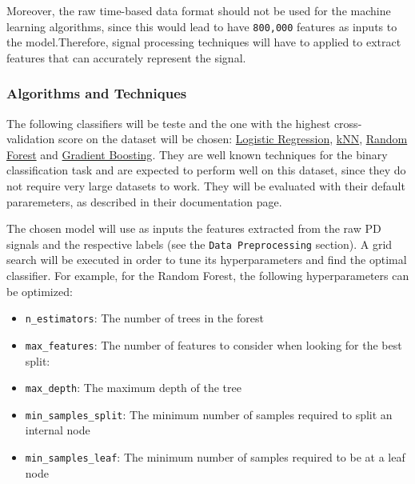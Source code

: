 \documentclass[11pt]{article}
\providecommand{\tightlist}{%
      \setlength{\itemsep}{0pt}\setlength{\parskip}{0pt}}
\begin{document}
Moreover, the raw time-based data format should not be used for the
machine learning algorithms, since this would lead to have
\texttt{800,000} features as inputs to the model.Therefore, signal
processing techniques will have to applied to extract features that can
accurately represent the signal.

\hypertarget{algorithms-and-techniques}{%
\subsubsection{Algorithms and
Techniques}\label{algorithms-and-techniques}}

The following classifiers will be teste and the one with the highest
cross-validation score on the dataset will be chosen:
\href{https://scikit-learn.org/stable/modules/generated/sklearn.linear_model.LogisticRegression.html}{Logistic
Regression},
\href{https://scikit-learn.org/stable/modules/generated/sklearn.neighbors.KNeighborsClassifier.html}{kNN},
\href{https://scikit-learn.org/stable/modules/generated/sklearn.ensemble.RandomForestClassifier.html}{Random
Forest} and
\href{https://scikit-learn.org/stable/modules/generated/sklearn.ensemble.GradientBoostingClassifier.html}{Gradient
Boosting}. They are well known techniques for the binary classification
task and are expected to perform well on this dataset, since they do not
require very large datasets to work. They will be evaluated with their
default pararemeters, as described in their documentation page.

The chosen model will use as inputs the features extracted from the raw
PD signals and the respective labels (see the
\texttt{Data\ Preprocessing} section). A grid search will be executed in
order to tune its hyperparameters and find the optimal classifier. For
example, for the Random Forest, the following hyperparameters can be
optimized:

\begin{itemize}
\tightlist
\item
  \texttt{n\_estimators}: The number of trees in the forest
\item
  \texttt{max\_features}: The number of features to consider when
  looking for the best split:
\item
  \texttt{max\_depth}: The maximum depth of the tree
\item
  \texttt{min\_samples\_split}: The minimum number of samples required
  to split an internal node
\item
  \texttt{min\_samples\_leaf}: The minimum number of samples required to
  be at a leaf node
\end{itemize}
\end{document}
